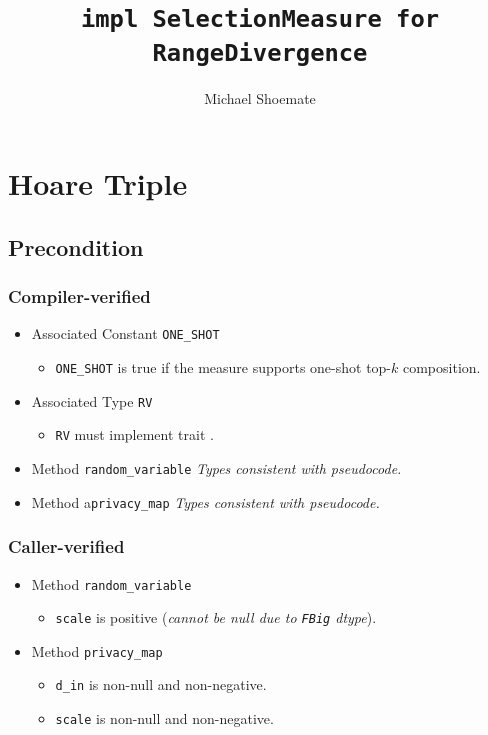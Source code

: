 \documentclass{article}
\title{\texttt{impl SelectionMeasure for RangeDivergence}}
\author{Michael Shoemate}
\begin{document}
  
\maketitle 
 
\section{Hoare Triple} 
\subsection*{Precondition} 
\subsubsection*{Compiler-verified}
\begin{itemize}
    \item Associated Constant \texttt{ONE\_SHOT}
        \begin{itemize}
            \item \texttt{ONE\_SHOT} is true if the measure supports one-shot top-$k$ composition.
        \end{itemize}
    \item Associated Type \texttt{RV}
        \begin{itemize}
            \item \texttt{RV} must implement trait .
        \end{itemize}
    \item Method \texttt{random\_variable}
        \textit{Types consistent with pseudocode.}
    \item Method a\texttt{privacy\_map}
        \textit{Types consistent with pseudocode.}
\end{itemize}

\subsubsection*{Caller-verified}
\begin{itemize}
    \item Method \texttt{random\_variable}
        \begin{itemize}
            \item \texttt{scale} is positive (\textit{cannot be null due to \texttt{FBig} dtype}).
        \end{itemize}
    \item Method \texttt{privacy\_map}
        \begin{itemize}
            \item \texttt{d\_in} is non-null and non-negative.
            \item \texttt{scale} is non-null and non-negative.
        \end{itemize}
\end{itemize}
\end{document}
